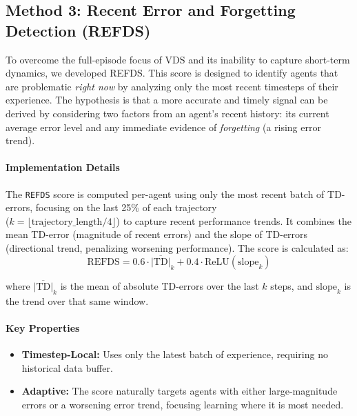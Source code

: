 \subsection{Method 3: Recent Error and Forgetting Detection (REFDS)}
\label{subsec:REFDS_method}

To overcome the full-episode focus of VDS and its inability to capture short-term dynamics, we developed REFDS. This score is designed to identify agents that are problematic \textit{right now} by analyzing only the most recent timesteps of their experience. The hypothesis is that a more accurate and timely signal can be derived by considering two factors from an agent's recent history: its current average error level and any immediate evidence of \textit{forgetting} (a rising error trend).


\paragraph{Implementation Details}

The \texttt{REFDS} score is computed per-agent using only the most recent batch of TD-errors, focusing on the last 25\% of each trajectory \\ ($k = \lfloor \text{trajectory\_length} / 4 \rfloor$) to capture recent performance trends. It combines the mean TD-error (magnitude of recent errors) and the slope of TD-errors (directional trend, penalizing worsening performance).
The score is calculated as:
\begin{equation}
    \text{REFDS} = 0.6 \cdot \overline{|\text{TD}|}_k + 0.4 \cdot \text{ReLU}(\text{slope}_k)
    \label{eq:REFDS}
\end{equation}

where $\overline{|\text{TD}|}_k$ is the mean of absolute TD-errors over the last $k$ steps, and $\text{slope}_k$ is the trend over that same window.

\paragraph{Key Properties}
\begin{itemize}
    \item \textbf{Timestep-Local:} Uses only the latest batch of experience, requiring no historical data buffer.
    \item \textbf{Adaptive:} The score naturally targets agents with either large-magnitude errors or a worsening error trend, focusing learning where it is most needed.
\end{itemize}


